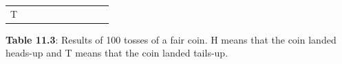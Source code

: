 {{\begin{center}
\begin{xtabular}[t]{|l|l|l|l|l|l|l|l|l|l|}
        T%
     \tabularnewline{}
    \end{xtabular}
      \end{center}
    \begin{center}{\small\bfseries Table 11.3}: Results of 100 tosses of a fair coin. H means that the coin
landed heads-up and T means that the coin landed tails-up.\end{center}
    
    \addtocounter{footnote}{-0}
    
          } %
        }{%
        }
